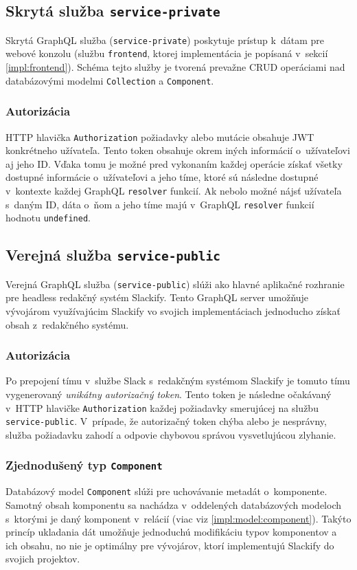 \subsection{Skrytá služba \texttt{service-private}}
\label{impl:service-private}
Skrytá GraphQL služba (\texttt{service-private}) poskytuje prístup k~dátam pre webové konzolu (službu \texttt{frontend}, ktorej implementácia je popísaná v~sekcií \ref{impl:frontend}). Schéma tejto služby je tvorená prevažne CRUD operáciami nad databázovými modelmi \texttt{Collection} a \texttt{Component}.

\subsubsection{Autorizácia}
HTTP hlavička \texttt{Authorization} požiadavky alebo mutácie obsahuje JWT konkrétneho užívateľa. Tento token obsahuje okrem iných informácií o~užívateľovi aj jeho ID. Vďaka tomu je možné pred vykonaním každej operácie získať všetky dostupné informácie o~užívateľovi a jeho tíme, ktoré sú následne dostupné v~kontexte každej GraphQL \texttt{resolver} funkcií. Ak nebolo možné nájsť užívateľa s~daným ID, dáta o~ňom a jeho tíme majú v~GraphQL \texttt{resolver} funkcií hodnotu \texttt{undefined}.

\subsection{Verejná služba \texttt{service-public}}
\label{impl:service-public}
Verejná GraphQL služba (\texttt{service-public}) slúži ako hlavné aplikačné rozhranie pre headless redakčný systém Slackify. Tento GraphQL server umožňuje vývojárom využívajúcim Slackify vo svojich implementáciach jednoducho získať obsah z~redakčného systému.

\subsubsection{Autorizácia}
Po prepojení tímu v~službe Slack s~redakčným systémom Slackify je tomuto tímu vygenerovaný \emph{unikátny autorizačný token}. Tento token je následne očakávaný v~HTTP hlavičke \texttt{Authorization} každej požiadavky smerujúcej na službu \texttt{service-public}. V~prípade, že autorizačný token chýba alebo je nesprávny, služba požiadavku zahodí a odpovie chybovou správou vysvetlujúcou zlyhanie. 

\subsubsection{Zjednodušený typ \texttt{Component}}
Databázový model \texttt{Component} slúži pre uchovávanie metadát o~komponente. Samotný obsah komponentu sa nachádza v~oddelených databázových modeloch s~ktorými je daný komponent v~relácií (viac viz \ref{impl:model:component}). Takýto princíp ukladania dát umožňuje jednoduchú modifikáciu typov komponentov a ich obsahu, no nie je optimálny pre vývojárov, ktorí implementujú Slackify do svojich projektov. \\

